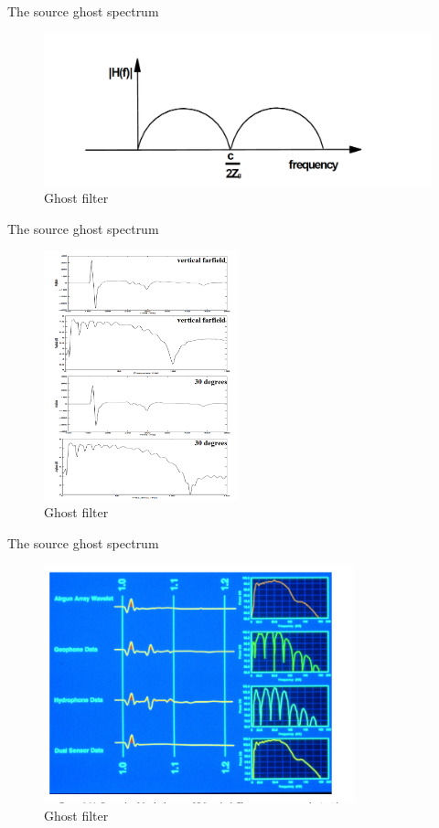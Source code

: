\documentclass[xcolor=dvipsnames,notes]{beamer}
\begin{document}
\begin{frame}{The source ghost spectrum}
\begin{figure}
  \includegraphics[width=\textwidth]{Fig/ghost-spec.png}
  \caption{Ghost filter}
  \label{fig:ghost-spec}
\end{figure}
\end{frame}
\begin{frame}{The source ghost spectrum}
\begin{figure}
  \includegraphics[width=0.5\textwidth]{Fig/ghost2.png}
  \caption{Ghost filter}
  \label{fig:ghost2}
\end{figure}
\end{frame}
\begin{frame}{The source ghost spectrum}
\begin{figure}
  \includegraphics[width=0.8\textwidth]{Fig/ghost3.png}
  \caption{Ghost filter}
  \label{fig:ghost3}
\end{figure}
\end{frame}
\end{document}
